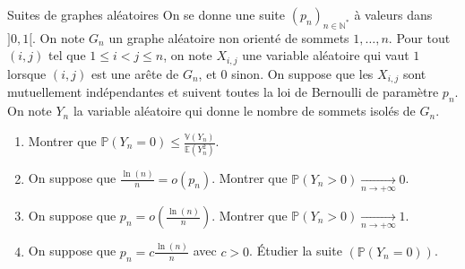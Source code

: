 \documentclass[french,a4paper]{article}
\renewcommand{\P}{\mathbb{P}}
\newcommand{\N}{\mathbb{N}}
\newcommand{\st}{^*}
\newcommand{\E}{\mathbb{E}}
\newcommand{\V}{\mathbb{V}}
\theoremstyle{plain}
\theoremstyle{definition}
\theoremstyle{remark}
\begin{document}
\begin{ex}[Châteaux]{Suites de graphes aléatoires}
	On se donne une suite $(p_n)_{n\in\N\st}$ à valeurs dans $]0,1[$. On note $G_n$ un graphe aléatoire non orienté de sommets $1,\ldots,n$. Pour tout $(i,j)$ tel que $1\leqslant i<j\leqslant n$, on note $X_{i,j}$ une variable aléatoire qui vaut $1$ lorsque $(i,j)$ est une arête de $G_n$, et $0$ sinon. On suppose que les $X_{i,j}$ sont mutuellement indépendantes et suivent toutes la loi de Bernoulli de paramètre $p_n$. On note $Y_n$ la variable aléatoire qui donne le nombre de sommets isolés de $G_n$.
	\begin{enumerate}
		\item Montrer que $\P(Y_n=0)\leqslant\displaystyle\frac{\V(Y_n)}{\E(Y_n^2)}$.
		\item On suppose que $\displaystyle\frac{\ln(n)}{n}=o(p_n)$. Montrer que $\P(Y_n>0)\xrightarrow[n\to+\infty]{}0$.
		\item On suppose que $\displaystyle p_n=o\left(\frac{\ln(n)}{n}\right)$. Montrer que $\P(Y_n>0)\xrightarrow[n\to+\infty]{}1$.
		\item On suppose que $p_n=c\displaystyle\frac{\ln(n)}{n}$ avec $c>0$. Étudier la suite $(\P(Y_n=0))$. 
	\end{enumerate}
\end{ex}
\end{document}
